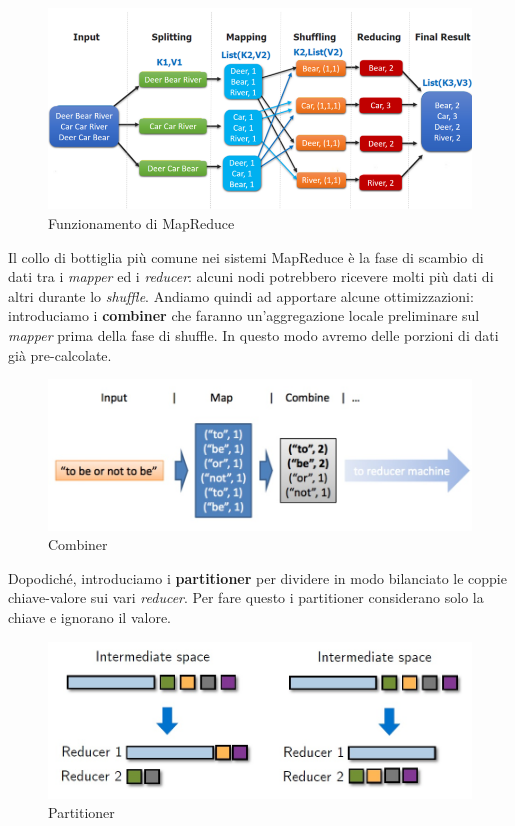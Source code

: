 \documentclass{article}
\begin{document}
\begin{appendices}
\begin{figure}[H]
    \centering
    \includegraphics[scale=0.6]{img/mapreduce.png}
    \caption{Funzionamento di MapReduce}
\end{figure}\noindent
Il collo di bottiglia più comune nei sistemi MapReduce è la fase di scambio di dati tra i \textit{mapper} ed i \textit{reducer}: alcuni nodi potrebbero ricevere molti più dati di altri durante lo \textit{shuffle}. Andiamo quindi ad apportare alcune ottimizzazioni: introduciamo i \textbf{combiner} che faranno un'aggregazione locale preliminare sul \textit{mapper} prima della fase di shuffle. In questo modo avremo delle porzioni di dati già pre-calcolate.
\begin{figure}[H]
    \centering
    \includegraphics[scale=0.4]{img/combiner.jpg}
    \caption{Combiner}
\end{figure}\noindent
Dopodiché, introduciamo i \textbf{partitioner} per dividere in modo bilanciato le coppie chiave-valore sui vari \textit{reducer}. Per fare questo i partitioner considerano solo la chiave e ignorano il valore.
\begin{figure}[H]
    \centering
    \includegraphics[scale=0.4]{img/partitioner.jpg}
    \caption{Partitioner}
\end{figure}\noindent

\end{appendices}
\end{document}
